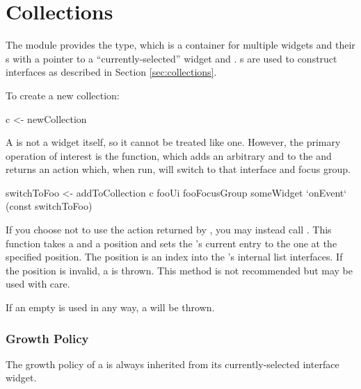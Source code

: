 \section{Collections}

The  module provides the  type, which
is a container for multiple widgets and their s with a
pointer to a ``currently-selected'' widget and .
s are used to construct interfaces as described in
Section \ref{sec:collections}.

To create a new collection:

\begin{haskellcode}
 c <- newCollection
\end{haskellcode}

A  is not a widget itself, so it cannot be treated like
one.  However, the primary operation of interest is the
 function, which adds an arbitrary 
and  to the  and returns an 
action which, when run, will switch to that interface and focus group.

\begin{haskellcode}
 switchToFoo <- addToCollection c fooUi fooFocusGroup
 someWidget `onEvent` (const switchToFoo)
\end{haskellcode}

If you choose not to use the  action returned by
, you may instead call .  This
function takes a  and a position and sets the
's current entry to the one at the specified position.
The position is an index into the 's internal list
interfaces.  If the position is invalid, a  is
thrown.  This method is not recommended but may be used with care.


If an empty  is used in any way, a 
will be thrown.

\subsubsection{Growth Policy}

The growth policy of a  is always inherited from its
currently-selected interface widget.
